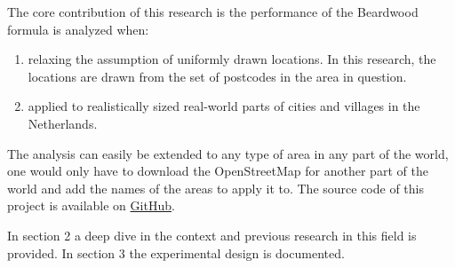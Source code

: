 The core contribution of this research is the performance of the Beardwood formula is analyzed when: 
\begin{enumerate}
  \item relaxing the assumption of uniformly drawn locations. In this research,
	the locations are drawn from the set of postcodes in the area in question.
  \item applied to realistically sized real-world parts of cities and villages in the Netherlands.
\end{enumerate}
The analysis can easily be extended to any type of area in any part of the world, one would only
have to download the OpenStreetMap \citep{openstreetmap} for another part of the world and add the names of the areas
to apply it to. The source code of this project is available on 
\href{https://github.com/koen1859/Scriptie}{GitHub}.

In section 2 a deep dive in the context and previous research in this field is provided.
In section 3 the experimental design is documented.
